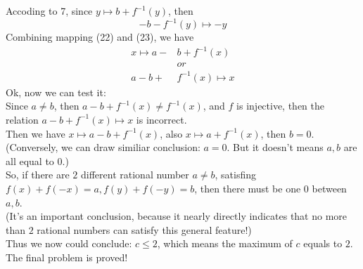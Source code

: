 \documentclass{Math_Note}
\begin{document}
\begin{sol}
\begin{equation}
\end{equation}
Accoding to 7, since $y \mapsto b+f^{-1}(y)$, then 
\begin{equation}
    -b-f^{-1}(y) \mapsto -y
\end{equation}
Combining mapping (22) and (23), we have 
\begin{equation}
    \begin{split}
        x \mapsto a-&b+f^{-1}(x) \\
        & or \\
        a-b+&f^{-1}(x) \mapsto x
    \end{split}
\end{equation}
Ok, now we can test it: \\
Since $a\neq b$, then $a-b+f^{-1}(x)\neq f^{-1}(x)$, and $f$ is injective, then the relation $a-b+f^{-1}(x) \mapsto x$ is incorrect. \\
Then we have $x \mapsto a-b+f^{-1}(x)$, also $x \mapsto a+f^{-1}(x)$, then $b=0$. \\
(Conversely, we can draw similiar conclusion: $a=0$. But it doesn't means $a, b$ are all equal to $0$.) \\
So, if there are $2$ different rational number $a\neq b$, satisfing $f(x)+f(-x)=a, f(y)+f(-y)=b$, then there must be one $0$ between $a, b$. \\
\textcolor{softcyan}{
(It's an important conclusion, because it nearly directly indicates that no more than $2$ rational numbers can satisfy this general feature!) \\
}
Thus we now could conclude: $c\leq 2$, which means the maximum of $c$ equals to $2$. \\
The final problem is proved! 
\end{sol}
\end{document}
